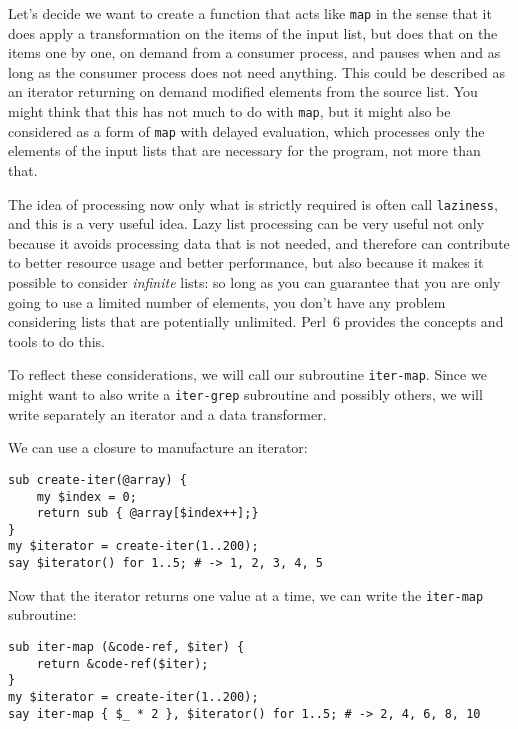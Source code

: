 Let's decide we want to create a function that acts like 
{\tt map} in the sense that it does apply a 
transformation on the items of the input list, but does 
that on the items one by one, on demand from a consumer 
process, and pauses when and as long as the consumer process 
does not need anything. This could be described as an 
iterator returning on demand modified elements from the 
source list. You might think that this has not much to 
do with {\tt map}, but it might also be considered as 
a form of {\tt map} with delayed evaluation, which 
processes only the elements of the input lists that are 
necessary for the program, not more than that. 

The idea 
of processing now only what is strictly required is often call 
{\tt laziness}, and this is a very useful idea. Lazy 
list processing can be very useful not only because it 
avoids processing data that is not needed, and therefore 
can contribute to better resource usage and better 
performance, but also because it makes it possible to consider 
\emph{infinite} lists: so long as you can guarantee that 
you are only going to use a limited number of elements, 
you don't have any problem considering lists that are 
potentially unlimited. Perl~6 provides the concepts and 
tools to do this.

To reflect these considerations, we will call our subroutine 
{\tt iter-map}. Since we might want to also write a 
{\tt iter-grep} subroutine and possibly others, we will 
write separately an iterator and a data transformer.

We can use a closure to manufacture an iterator:

\begin{verbatim}
sub create-iter(@array) {
    my $index = 0;
    return sub { @array[$index++];}
}
my $iterator = create-iter(1..200);
say $iterator() for 1..5; # -> 1, 2, 3, 4, 5
\end{verbatim} 

Now that the iterator returns one value at a time, we 
can write the {\tt iter-map} subroutine:

\begin{verbatim}
sub iter-map (&code-ref, $iter) {
    return &code-ref($iter);
}
my $iterator = create-iter(1..200);
say iter-map { $_ * 2 }, $iterator() for 1..5; # -> 2, 4, 6, 8, 10
\end{verbatim}

